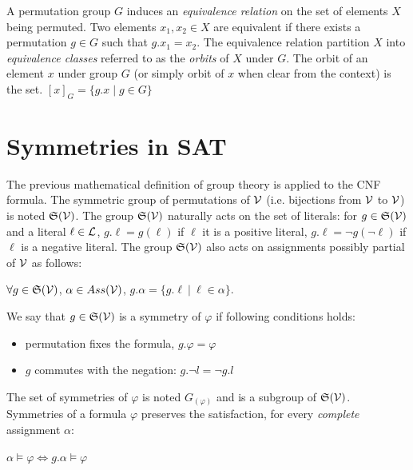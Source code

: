 A permutation group $G$ induces an \emph{equivalence relation} on the set of elements $X$ being
permuted. Two elements $x_1, x_2 \in X$ are equivalent if there exists a permutation $g \in G$ such that
$g.x_1 = x_2$. The equivalence relation partition $X$ into \emph{equivalence classes} referred to
as the \emph{orbits} of $X$ under $G$. The orbit of an element $x$ under group $G$ (or simply orbit of $x$ when clear
from the context) is the set. $[x]_G = \{g.x \mid g \in G\}$

\section{Symmetries in SAT}
The previous mathematical definition of group theory is applied to the CNF formula.
The symmetric group of permutations of $\mathcal{V}$ (i.e. bijections from $\mathcal{V}$ to $\mathcal{V}$) is noted
$\mathfrak{S}(\mathcal{V})$. The group $\mathfrak{S}(\mathcal{V})$ naturally acts on the set of literals: for $g
\in \mathfrak{S}(\mathcal{V})$ and a literal $\ell \in \mathcal{L} $, $g.\ell = g(\ell)$ if $\ell$ it is a
positive literal, $g.\ell = \neg g(\neg \ell)$ if $\ell$ is a negative literal.
The group $\mathfrak{S}(\mathcal{V})$ also acts on  assignments possibly partial of $\mathcal{V}$ as follows: 
\begin{center}
 $\forall g \in \mathfrak{S}(\mathcal{V})$, $\alpha \in Ass(\mathcal{V})$, $g.\alpha = \{ g.\ell ~|~ \ell \in \alpha \}$.
\end{center}
 We say that $g\in \mathfrak{S}(\mathcal{V})$ is a symmetry of $ \varphi$ if following conditions holds:
\begin{itemize}[topsep=0em]
 \item permutation fixes the formula, $g.\varphi =  \varphi$ 
 \item $g$  commutes with the negation: $g.\neg l  = \neg g.l$
\end{itemize}
The set of symmetries of $\varphi$ is noted $G_(\varphi)$ and is a subgroup of $\mathfrak{S}(\mathcal{V})$.
Symmetries of a formula $\varphi$ preserves the satisfaction, for every \emph{complete} assignment $\alpha$:
\begin{center}
 $\alpha \models \varphi\Leftrightarrow g.\alpha \models \varphi$
\end{center}
